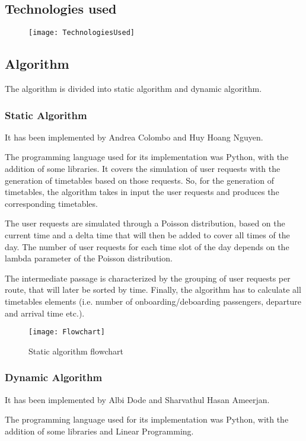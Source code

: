 \subsection{Technologies used}
\begin{figure}[H]
	\centering
	\texttt{[image: TechnologiesUsed]}
\end{figure}

\subsection{Algorithm}
The algorithm is divided into static algorithm and dynamic algorithm.

\subsubsection{Static Algorithm}
It has been implemented by Andrea Colombo and Huy Hoang Nguyen.

The programming language used for its implementation was Python, with the addition of some libraries. It covers the simulation of user requests with the generation of timetables based on those requests. So, for the generation of timetables, the algorithm takes in input the user requests and produces the corresponding timetables.

The user requests are simulated through a Poisson distribution, based on the current time and a delta time that will then be added to cover all times of the day. The number of user requests for each time slot of the day depends on the lambda parameter of the Poisson distribution.

The intermediate passage is characterized by the grouping of user requests per route, that will later be sorted by time. Finally, the algorithm has to calculate all timetables elements (i.e. number of onboarding/deboarding passengers, departure and arrival time etc.).

\begin{figure}[H]
	\centering
	\texttt{[image: Flowchart]}
	\caption{Static algorithm flowchart}
\end{figure}
\newpage
\subsubsection{Dynamic Algorithm}
It has been implemented by Albi Dode and Sharvathul Hasan Ameerjan.

The programming language used for its implementation was Python, with the addition of some libraries and Linear Programming.

